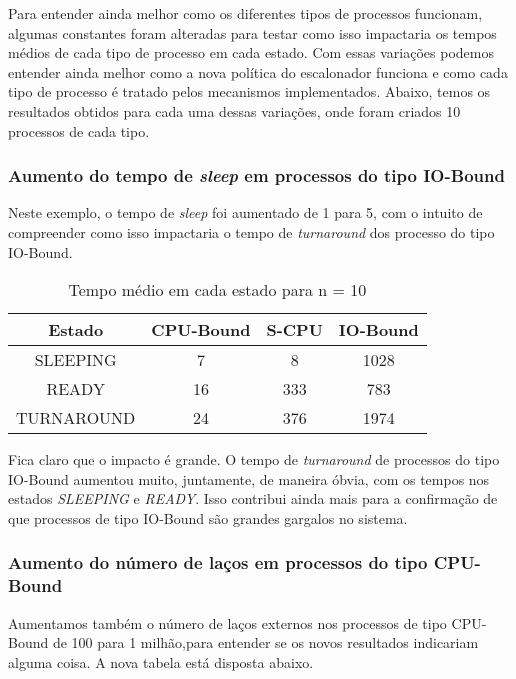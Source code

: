 \documentclass{article}
\begin{document}
Para entender ainda melhor como os diferentes tipos de processos funcionam,
algumas constantes foram alteradas para testar como isso impactaria os tempos
médios de cada tipo de processo em cada estado. Com essas variações podemos
entender ainda melhor como a nova política do escalonador funciona e como cada
tipo de processo é tratado pelos mecanismos implementados. Abaixo, temos os
resultados obtidos para cada uma dessas variações, onde foram criados 10
processos de cada tipo.

\subsubsection{Aumento do tempo de \textit{sleep} em processos do tipo
      IO-Bound}

Neste exemplo, o tempo de \textit{sleep} foi aumentado de 1 para 5, com o
intuito de compreender como isso impactaria o tempo de \textit{turnaround} dos
processo do tipo IO-Bound.

\begin{table}[H]
      \centering
      \begin{tabular}{|c|c|c|c|}
            \hline
            Estado     & CPU-Bound & S-CPU &
            IO-Bound                              \\
            \hline
            SLEEPING   & 7         & 8     & 1028 \\
            READY      & 16        & 333   & 783  \\
            TURNAROUND & 24        & 376   & 1974 \\
            \hline
      \end{tabular}
      \caption{Tempo médio em cada estado para n = 10}
\end{table}

Fica claro que o impacto é grande. O tempo de \textit{turnaround} de processos
do tipo IO-Bound aumentou muito, juntamente, de maneira óbvia, com os tempos
nos estados \textit{SLEEPING} e \textit{READY}. Isso contribui ainda mais para a
confirmação de que processos de tipo IO-Bound são grandes gargalos no sistema.

\subsubsection{Aumento do número de laços em processos do tipo CPU-Bound}

Aumentamos também o número de laços externos nos processos de tipo CPU-Bound de
100 para 1 milhão,para entender se os novos resultados indicariam alguma coisa.
A nova tabela está disposta abaixo.
\end{document}
